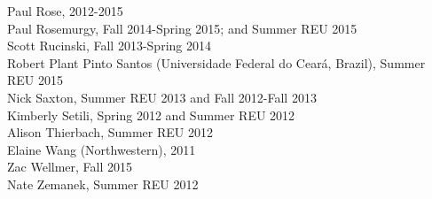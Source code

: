 \documentclass[9pt]{extarticle}
\begin{document}
Paul Rose, 2012-2015 \\
Paul Rosemurgy, Fall 2014-Spring 2015; and Summer REU 2015 \\
Scott Rucinski, Fall 2013-Spring 2014 \\
Robert Plant Pinto Santos (Universidade Federal do Cear\'{a}, Brazil), Summer REU 2015 \\
Nick Saxton, Summer REU 2013 and Fall 2012-Fall 2013 \\
Kimberly Setili, Spring 2012 and Summer REU 2012 \\
Alison Thierbach, Summer REU 2012 \\
Elaine Wang (Northwestern), 2011 \\
Zac Wellmer, Fall 2015 \\
Nate Zemanek, Summer REU 2012 \\
\end{document}
